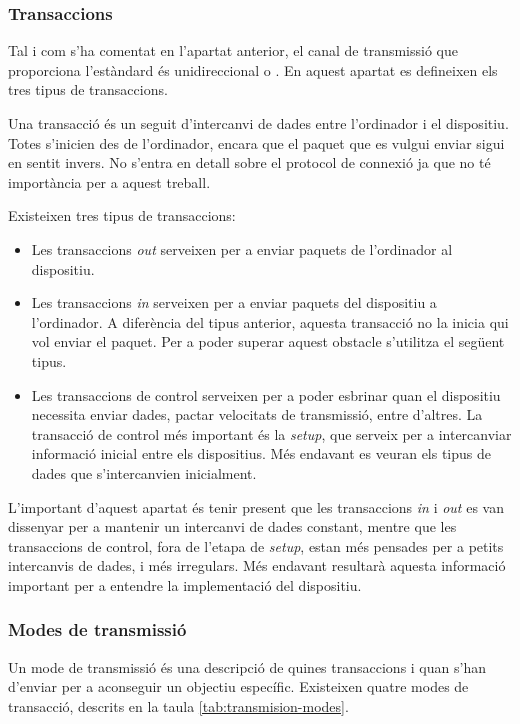 \subsubsection*{Transaccions}

Tal i com s'ha comentat en l'apartat anterior, el canal de transmissió que
proporciona l'estàndard és unidireccional o . En aquest
apartat es defineixen els tres tipus de transaccions.

Una transacció és un seguit d'intercanvi de dades entre l'ordinador i el
dispositiu. Totes s'inicien des de l'ordinador, encara que el paquet que es
vulgui enviar sigui en sentit invers. No s'entra en detall sobre el protocol
de connexió ja que no té importància per a aquest treball.

Existeixen tres tipus de transaccions:
\begin{itemize}
    \item Les transaccions \emph{out} serveixen per a enviar paquets de
    l'ordinador al dispositiu.
    \item Les transaccions \emph{in} serveixen per a enviar paquets del
    dispositiu a l'ordinador. A diferència del tipus anterior, aquesta
    transacció no la inicia qui vol enviar el paquet. Per a poder
    superar aquest obstacle s'utilitza el següent tipus.
    \item Les transaccions de control serveixen per a poder esbrinar quan el
    dispositiu necessita enviar dades, pactar velocitats de transmissió, entre
    d'altres. La transacció de control més important és la \emph{setup},
    que serveix per a intercanviar informació inicial entre els dispositius. Més
    endavant es veuran els tipus de dades que s'intercanvien inicialment.
\end{itemize}

L'important d'aquest apartat és tenir present que les transaccions \emph{in} i
\emph{out} es van dissenyar per a mantenir un intercanvi de dades constant,
mentre que les transaccions de control, fora de l'etapa de \emph{setup}, estan
més pensades per a petits intercanvis de dades, i més irregulars. Més endavant
resultarà aquesta informació important per a entendre la implementació del
dispositiu.

\subsubsection*{Modes de transmissió}

Un mode de transmissió és una descripció de quines transaccions i quan s'han
d'enviar per a aconseguir un objectiu específic. Existeixen quatre modes
de transacció, descrits en la taula \ref{tab:transmision-modes}.

